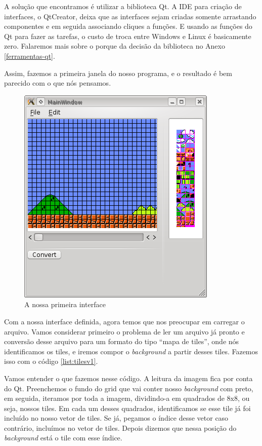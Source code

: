 A solução que encontramos é utilizar a biblioteca Qt. A IDE para criação de interfaces, o QtCreator, deixa que as interfaces sejam criadas somente arrastando componentes e em seguida associando cliques a funções. E usando as funções do Qt para fazer as tarefas, o custo de troca entre Windows e Linux é basicamente zero. Falaremos mais sobre o porque da decisão da biblioteca no Anexo \ref{ferramentas-qt}.

Assim, fazemos a primeira janela do nosso programa, e o resultado é bem parecido com o que nós pensamos.

\begin{figure}[h!]
\centering
\includegraphics{imgs/mainwindow_1.png}
\caption{A nossa primeira interface} 
\end{figure}

Com a nossa interface definida, agora temos que nos preocupar em carregar o arquivo. Vamos considerar primeiro o problema de ler um arquivo já pronto e conversão desse arquivo para um formato do tipo ``mapa de tiles'', onde nós identificamos os tiles, e iremos compor o \textit{background} a partir desses tiles. Fazemos isso com o código \ref{list:tilesv1}.

Vamos entender o que fazemos nesse código. A leitura da imagem fica por conta do Qt. Preenchemos o fundo do grid que vai conter nosso \textit{background} com preto, em seguida, iteramos por toda a imagem, dividindo-a em quadrados de 8x8, ou seja, nossos tiles. Em cada um desses quadrados, identificamos se esse tile já foi incluído no nosso vetor de tiles. Se já, pegamos o índice desse vetor caso contrário, incluímos no vetor de tiles. Depois dizemos que nessa posição do \textit{background} está o tile com esse índice. 

